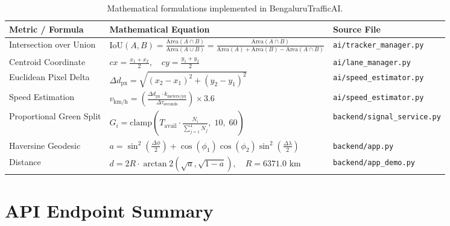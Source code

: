 \begin{table}[H]
\centering
\small
\begin{tabularx}{\textwidth}{l X l}
\toprule
\textbf{Metric / Formula} & \textbf{Mathematical Equation} & \textbf{Source File} \\
\midrule
Intersection over Union & $\text{IoU}(A, B) = \frac{\text{Area}(A \cap B)}{\text{Area}(A \cup B)} = \frac{\text{Area}(A \cap B)}{\text{Area}(A) + \text{Area}(B) - \text{Area}(A \cap B)}$ & \texttt{ai/tracker\_manager.py} \\[12pt]
Centroid Coordinate & $cx = \frac{x_1 + x_2}{2}, \quad cy = \frac{y_1 + y_2}{2}$ & \texttt{ai/lane\_manager.py} \\[10pt]
Euclidean Pixel Delta & $\Delta d_{\text{px}} = \sqrt{(x_2 - x_1)^2 + (y_2 - y_1)^2}$ & \texttt{ai/speed\_estimator.py} \\[10pt]
Speed Estimation & $v_{\text{km/h}} = \left(\frac{\Delta d_{\text{px}} \cdot k_{\text{meters/px}}}{\Delta \tau_{\text{seconds}}}\right) \times 3.6$ & \texttt{ai/speed\_estimator.py} \\[12pt]
Proportional Green Split & $G_i = \text{clamp}\left(T_{\text{avail}} \cdot \frac{N_i}{\sum_{j=1}^4 N_j}, \; 10, \; 60\right)$ & \texttt{backend/signal\_service.py} \\[12pt]
Haversine Geodesic & $a = \sin^2\left(\frac{\Delta \phi}{2}\right) + \cos(\phi_1)\cos(\phi_2)\sin^2\left(\frac{\Delta \lambda}{2}\right)$ & \texttt{backend/app.py} \\[6pt]
Distance & $d = 2 R \cdot \arctan2\left(\sqrt{a}, \sqrt{1 - a}\right), \quad R = 6371.0\text{ km}$ & \texttt{backend/app\_demo.py} \\
\bottomrule
\end{tabularx}
\caption{Mathematical formulations implemented in BengaluruTrafficAI.}
\label{tab:glossary_formulas}
\end{table}

\section{API Endpoint Summary}
\label{sec:glossary_endpoints}

